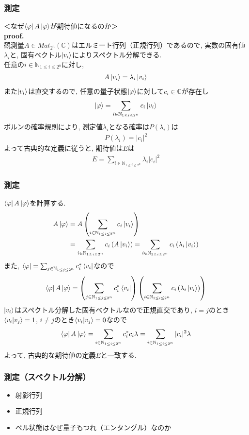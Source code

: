 \documentclass[9pt]{beamer}
\begin{document}
\begin{frame}
  \frametitle{測定}
  ＜なぜ$\bra{\varphi}A\ket{\varphi}$が期待値になるのか＞\\
  \textbf{proof.} \\
  観測量$A \in Mat_{2^n}(\mathbb{C})$はエルミート行列（正規行列）であるので, 実数の固有値$\lambda_i$と, 固有ベクトル$\ket{v_i}$によりスペクトル分解できる. \\
  任意の$i \in \mathbb{N}_{1\le i \le 2^n}$に対し,
  \begin{align}
    A\ket{v_i} = \lambda_i \ket{v_i}
  \end{align}
  また$\ket{v_i}$は直交するので, 任意の量子状態$\ket{\varphi}$に対して$c_i \in \mathbb{C}$が存在し
  \begin{align}
    \ket{\varphi} = \sum_{i \in \mathbb{N}_{1 \le i \le 2^n}} c_i \ket{v_i}
  \end{align}
  ボルンの確率規則により, 測定値$\lambda_i$となる確率は$P\left(\lambda_i\right)$は
  \begin{align}
    P\left( \lambda_i \right) = |c_i|^2
  \end{align}
  よって古典的な定義に従うと, 期待値は$E$は
  \begin{align}
    E = \sum_{i \in \mathbb{N}_{1 \le i \le 2^n}} \lambda_i |c_i|^2
  \end{align}
\end{frame}

\begin{frame}
  \frametitle{測定}
  $\bra{\varphi}A\ket{\varphi}$を計算する.
  \begin{align}
    A\ket{\varphi} &= A \left( \sum_{i \in \mathbb{N}_{1 \le i \le 2^n}} c_i \ket{v_i} \right)\\
    &= \sum_{i \in \mathbb{N}_{1 \le i \le 2^n}} c_i \left( A \ket{v_i} \right) = \sum_{i \in \mathbb{N}_{1 \le i \le 2^n}} c_i \left( \lambda_i \ket{v_i} \right)
  \end{align}
  また, $\bra{\varphi} = \sum_{j \in \mathbb{N}_{1 \le j \le 2^n}} c_i^* \bra{v_i}$なので
  \begin{align}
    \bra{\varphi}A\ket{\varphi} = \left( \sum_{j \in \mathbb{N}_{1 \le j \le 2^n}} c_i^* \bra{v_i} \right) \left( \sum_{i \in \mathbb{N}_{1 \le i \le 2^n}} c_i \left( \lambda_i \ket{v_i} \right) \right)
  \end{align}
  $\ket{v_i}$はスペクトル分解した固有ベクトルなので正規直交であり, $i=j$のとき$\braket{v_i|v_j}=1$, $i\ne j$のとき$\braket{v_i|v_j}=0$なので
  \begin{align}
    \bra{\varphi}A\ket{\varphi} = \sum_{i \in \mathbb{N}_{1 \le i \le 2^n}} c_i^* c_i \lambda = \sum_{i \in \mathbb{N}_{1 \le i \le 2^n}} |c_i|^2 \lambda
  \end{align}
  よって, 古典的な期待値の定義$E$と一致する.
\end{frame}

\begin{frame}
  \frametitle{測定（スペクトル分解）}
  \begin{itemize}
    \item 射影行列
    \item 正規行列
    \item ベル状態はなぜ量子もつれ（エンタングル）なのか
  \end{itemize}
\end{frame}
\end{document}
